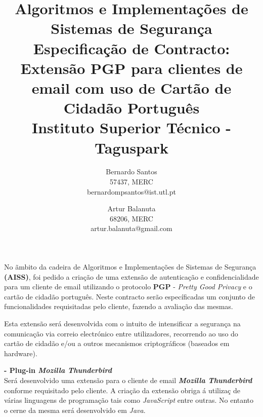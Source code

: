 \documentclass[times, 10pt,twocolumn]{article}
\begin{document}
\title{Algoritmos e Implementa\c{c}\~oes de Sistemas de Seguran\c{c}a\\
Especifica\c{c}\~ao de Contracto: \\
Extens\~ao PGP para clientes de email com uso de Cart\~ao de Cidad\~ao Portugu\^es 
\\ Instituto Superior T\'ecnico - Taguspark}

\author{Bernardo Santos\\ 57437, MERC \\  bernardompsantos@ist.utl.pt\\
\and
Artur Balanuta\\
68206, MERC\\
artur.balanuta@gmail.com\\
}

\maketitle
\thispagestyle{empty}

No \~ambito da cadeira de Algoritmos e Implementa\c{c}\~oes de Sistemas de Seguran\c{c}a \textbf{(AISS)}, foi pedido a cria\c{c}\~ao de uma extens\~ao de autentica\c{c}\~ao e confidencialidade para um cliente de email utilizando o protocolo \textbf{PGP} - \emph{Pretty Good Privacy} e o cart\~ao de cidad\~ao portugu\^es. Neste contracto serão espec\'ificadas um conjunto de funcionalidades requisitadas pelo cliente, fazendo a avalia\c{c}\~ao das mesmas.

Esta extens\~ao ser\'a desenvolvida com o intuito de intensificar a seguran\c{c}a na comunica\c{c}\~ao via correio electr\'onico entre utilizadores, recorrendo ao uso do cart\~ao de cidad\~ao e/ou a outros mecanismos criptogr\'aficos (baseados em hardware).



\noindent \textbf{- Plug-in \emph{Mozilla Thunderbird}}\\
\indent Ser\'a desenvolvido uma extens\~ao para o cliente de email \textbf{\emph{Mozilla Thunderbird}} conforme requisitado pelo cliente. A cria\c{c}\~ao da extens\~ao obriga \'a utiliza\c{c} de v\'arias linguagens de programa\c{c}\~ao tais como \emph{JavaScript} entre outras. No entanto o cerne da mesma ser\'a desenvolvido em \emph{Java}. \\
\end{document}
